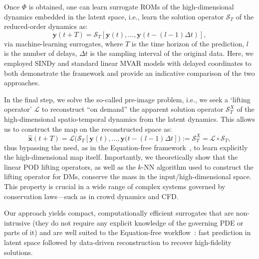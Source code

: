 \documentclass{article}
\begin{document}
Once $\varPhi$ is obtained, one can learn surrogate ROMs of the high-dimensional dynamics embedded in the latent space, i.e., learn the solution operator $\mathcal{S}_T$ of the reduced-order dynamics as:
\begin{equation}
\boldsymbol{y}(t+T)=\mathcal{S}_{T}[\boldsymbol{y}(t),\dots,\boldsymbol{y}(t-(l-1)\Delta t)],
\end{equation}
via machine-learning surrogates, where $T$ is the time horizon of the prediction, $l$ is the number of delays, $\Delta t$ is the sampling interval of the original data. Here, we employed SINDy and standard linear MVAR models with delayed coordinates to both demonstrate the framework and provide an indicative comparison of the two approaches.

In the final step, we solve the so-called pre-image problem, i.e., we seek a `lifting operator' $\mathcal{L}$ to reconstruct “on demand” the apparent solution operator $\mathcal{S}^{X}_T$ of the high-dimensional spatio-temporal dynamics from the latent dynamics. This allows us to construct the map on the reconstructed space as:
\begin{equation}
\hat{\boldsymbol{x}}(t+T)=\mathcal{L}\big(\mathcal{S}_{T}[\boldsymbol{y}(t),\dots,\boldsymbol{y}(t-(l-1)\Delta t]\big)
:=\mathcal{S}^{X}_T=\mathcal{L}\circ \mathcal{S}_{T}, 
\end{equation}
thus bypassing the need, as in the Equation-free framework~\cite{kevrekidis2003equation}, to learn explicitly the high-dimensional map itself. Importantly, we theoretically show that the linear POD lifting operators, as well as the $k$-NN algorithm used to construct the lifting operator for DMs, conserve the mass in the input/high-dimensional space. This property is crucial in a wide range of complex systems governed by conservation laws—such as in crowd dynamics and CFD.

Our approach yields compact, computationally efficient surrogates that are non-intrusive (they do not require any explicit knowledge of the governing PDE or parts of it) and are well suited to the Equation-free workflow~\cite{kevrekidis2003equation}: fast prediction in latent space followed by data-driven reconstruction to recover high-fidelity solutions. 
\end{document}

